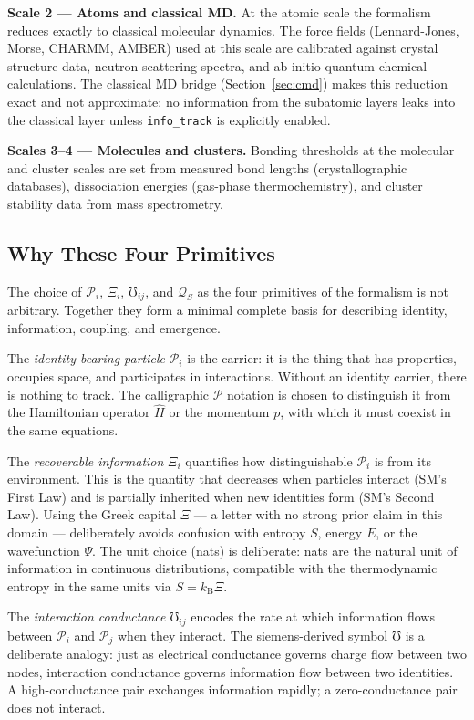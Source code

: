 \documentclass[11pt,a4paper]{article}
\newcommand{\Pid}{\mathscr{P}}
\newcommand{\Rec}{\Xi}
\newcommand{\Cond}{\mho}
\newcommand{\Quota}{\mathcal{Q}}
\begin{document}
\textbf{Scale 2 --- Atoms and classical MD.}
At the atomic scale the formalism reduces exactly to classical molecular
dynamics.  The force fields (Lennard-Jones, Morse, CHARMM, AMBER) used at
this scale are calibrated against crystal structure data, neutron scattering
spectra, and ab initio quantum chemical calculations.  The classical MD bridge
(Section~\ref{sec:cmd}) makes this reduction exact and not approximate: no
information from the subatomic layers leaks into the classical layer unless
\texttt{info\_track} is explicitly enabled.

\textbf{Scales 3--4 --- Molecules and clusters.}
Bonding thresholds at the molecular and cluster scales are set from measured
bond lengths (crystallographic databases), dissociation energies (gas-phase
thermochemistry), and cluster stability data from mass spectrometry.

\subsection{Why These Four Primitives}

The choice of $\Pid_i$, $\Rec_i$, $\Cond_{ij}$, and $\Quota_S$ as the four
primitives of the formalism is not arbitrary.  Together they form a minimal
complete basis for describing identity, information, coupling, and emergence.

The \emph{identity-bearing particle} $\Pid_i$ is the carrier: it is the
thing that has properties, occupies space, and participates in interactions.
Without an identity carrier, there is nothing to track.  The calligraphic
$\mathscr{P}$ notation is chosen to distinguish it from the Hamiltonian
operator $\hat{H}$ or the momentum $p$, with which it must coexist in the
same equations.

The \emph{recoverable information} $\Rec_i$ quantifies how distinguishable
$\Pid_i$ is from its environment.  This is the quantity that decreases when
particles interact (SM's First Law) and is partially inherited when new
identities form (SM's Second Law).  Using the Greek capital $\Xi$ --- a letter
with no strong prior claim in this domain --- deliberately avoids confusion
with entropy $S$, energy $E$, or the wavefunction $\Psi$.  The unit choice
(nats) is deliberate: nats are the natural unit of information in continuous
distributions, compatible with the thermodynamic entropy in the same units
via $S = k_{\mathrm{B}} \Rec$.

The \emph{interaction conductance} $\Cond_{ij}$ encodes the rate at which
information flows between $\Pid_i$ and $\Pid_j$ when they interact.  The
siemens-derived symbol $\mho$ is a deliberate analogy: just as electrical
conductance governs charge flow between two nodes, interaction conductance
governs information flow between two identities.  A high-conductance pair
exchanges information rapidly; a zero-conductance pair does not interact.
\end{document}
